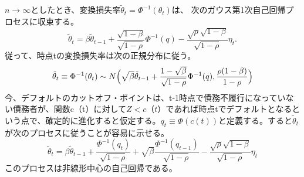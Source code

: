 \documentclass[a4j,12pt]{jarticle}
\begin{document}
$n\rightarrow\infty$としたとき、変換損失率$\tilde{\theta}_t=\Phi^{-1}(\theta_t)$は、
次のガウス第1次自己回帰プロセスに収束する。
\begin{equation}
\tilde{\theta}_t=\beta\tilde{\theta}_{t-1}+\frac{\sqrt{1-\beta}}{\sqrt{1-\rho}}\Phi^{-1}(q)-\frac{\sqrt{\rho}\sqrt{1-\beta}}{\sqrt{1-\rho}}\eta_t.
\label{eq:eq24}
\end{equation}
従って、時点tの変換損失率は次の正規分布に従う。
\begin{equation}
\tilde{\theta}_t\equiv\Phi^{-1}(\theta_t)\sim N\Bigl(\sqrt{\beta}\tilde{\theta}_{t-1}+\frac{1-\sqrt{\beta}}{\sqrt{1-\rho}}\Phi^{-1}(q),\frac{\rho(1-\beta)}{1-\rho}\Bigr)
\label{eq:eq25}
\end{equation}
今、デフォルトのカットオフ・ポイントは、t-1時点で債務不履行になっていない債務者が、関数c（t）に対して$Z<c（t）$であれば時点tでデフォルトとなるという点で、確定的に進化すると仮定する。$q_t\equiv\Phi(c(t))$と定義する。すると$\tilde{\theta}_t$が次のプロセスに従うことが容易に示せる。
\begin{equation}
\tilde{\theta}_t=\beta\tilde{\theta}_{t-1}+\frac{\Phi^{-1}(q_t)}{\sqrt{1-\rho}}
+\sqrt{\beta}\frac{\Phi^{-1}(q_{t-1})}{\sqrt{1-\rho}}
-\frac{\sqrt{\rho}\sqrt{1-\beta}}{\sqrt{1-\rho}}\eta_t
\end{equation}
このプロセスは非線形中心の自己回帰である。
\end{document}
